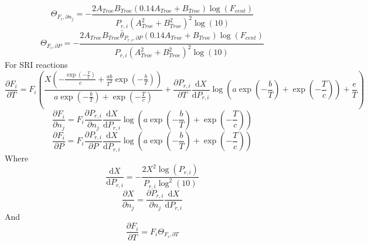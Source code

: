 \documentclass[a4paper,10pt]{article}
\begin{document}
\begin{dmath} \Theta_{F_i, \partial n_j} = - \frac{2 A_{Troe} B_{Troe} \left(0.14 A_{Troe} + B_{Troe}\right) \log{\left (F_{cent} \right )}}{P_{r, i} \left(A_{Troe}^{2} + B_{Troe}^{2}\right)^{2} \log{\left (10 \right )}}\end{dmath} 
\begin{dmath} \Theta_{F_i, \partial P} = - \frac{2 A_{Troe} B_{Troe} \bar{\theta}_{P_{r, i}, \partial P} \left(0.14 A_{Troe} + B_{Troe}\right) \log{\left (F_{cent} \right )}}{P_{r, i} \left(A_{Troe}^{2} + B_{Troe}^{2}\right)^{2} \log{\left (10 \right )}}\end{dmath} 
For SRI reactions
\begin{dmath} \frac{\partial F_{i} }{\partial T } = F_{i} \left(\frac{X \left(- \frac{\operatorname{exp}\left({- \frac{T}{c}}\right)}{c} + \frac{a b}{T^{2}} \operatorname{exp}\left({- \frac{b}{T}}\right)\right)}{a \operatorname{exp}\left({- \frac{b}{T}}\right) + \operatorname{exp}\left({- \frac{T}{c}}\right)} + \frac{\partial P_{r, i} }{\partial T } \frac{\text{d} X }{\text{d} P_{r, i} } \log{\left (a \operatorname{exp}\left({- \frac{b}{T}}\right) + \operatorname{exp}\left({- \frac{T}{c}}\right) \right )} + \frac{e}{T}\right)\end{dmath} 
\begin{dmath} \frac{\partial F_{i} }{\partial {n_j} } = F_{i} \frac{\partial P_{r, i} }{\partial {n_j} } \frac{\text{d} X }{\text{d} P_{r, i} } \log{\left (a \operatorname{exp}\left({- \frac{b}{T}}\right) + \operatorname{exp}\left({- \frac{T}{c}}\right) \right )}\end{dmath} 
\begin{dmath} \frac{\partial F_{i} }{\partial P } = F_{i} \frac{\partial P_{r, i} }{\partial P } \frac{\text{d} X }{\text{d} P_{r, i} } \log{\left (a \operatorname{exp}\left({- \frac{b}{T}}\right) + \operatorname{exp}\left({- \frac{T}{c}}\right) \right )}\end{dmath} 
Where
\begin{dmath} \frac{\text{d} X }{\text{d} P_{r, i} } = - \frac{2 X^{2} \log{\left (P_{r, i} \right )}}{P_{r, i} \log^{2}{\left (10 \right )}}\end{dmath} 
\begin{dmath} \frac{\partial X}{\partial n_j} = \frac{\partial P_{r, i} }{\partial {n_j} } \frac{\text{d} X }{\text{d} P_{r, i} }\end{dmath} 
And
\begin{dmath} \frac{\partial F_{i} }{\partial T } = F_{i} \Theta_{F_i, \partial T}\end{dmath} 
\end{document}
